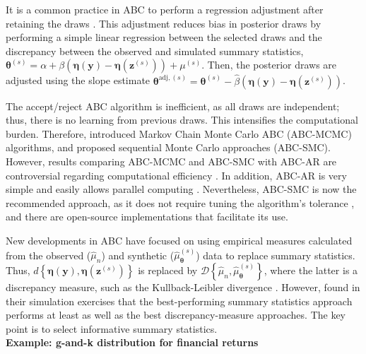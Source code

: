It is a common practice in ABC to perform a regression adjustment after retaining the draws \cite{beaumont2002approximate, leuenberger2010bayesian, sisson2018handbook}. This adjustment reduces bias in posterior draws by performing a simple linear regression between the selected draws and the discrepancy between the observed and simulated summary statistics, \( \boldsymbol{\theta}^{(s)} = \alpha + \beta \left(\boldsymbol{\eta}(\boldsymbol{y}) - \boldsymbol{\eta}(\boldsymbol{z}^{(s)})\right) + \mu^{(s)} \). Then, the posterior draws are adjusted using the slope estimate \( \boldsymbol{\theta}^{\text{adj},(s)} = \boldsymbol{\theta}^{(s)} - \hat{\beta} \left(\boldsymbol{\eta}(\boldsymbol{y}) - \boldsymbol{\eta}(\boldsymbol{z}^{(s)})\right) \).

The accept/reject ABC algorithm is inefficient, as all draws are independent; thus, there is no learning from previous draws. This intensifies the computational burden. Therefore, \cite{marjoram2003markov, wegmann2009efficient} introduced Markov Chain Monte Carlo ABC (ABC-MCMC) algorithms, and \cite{sisson2007sequential, drovandi2011estimation, del2012adaptive, lenormand2013adaptive} proposed sequential Monte Carlo approaches (ABC-SMC). However, results comparing ABC-MCMC and ABC-SMC with ABC-AR are controversial regarding computational efficiency \cite{bertorelle2010abc}. In addition, ABC-AR is very simple and easily allows parallel computing \cite{frazier2019approximate}. Nevertheless, ABC-SMC is now the recommended approach, as it does not require tuning the algorithm's tolerance \cite{martin2024approximating}, and there are open-source implementations that facilitate its use.

New developments in ABC have focused on using empirical measures calculated from the observed ($\hat{\mu}_n$) and synthetic ($\hat{\mu}_{\boldsymbol{\theta}}^{(s)}$) data to replace summary statistics. Thus, $d\left\{ \boldsymbol\eta ({\boldsymbol y}),{\boldsymbol \eta }({\boldsymbol z}^{(s)})\right\}$ is replaced by $\mathcal{D}\left\{ \hat{\mu}_n,\hat{\mu}_{\boldsymbol{\theta}}^{(s)}\right\}$, where the latter is a discrepancy measure, such as the Kullback-Leibler divergence \cite{jiang2018approximate}. However, \cite{drovandi2022comparison} found in their simulation exercises that the best-performing summary statistics approach performs at least as well as the best discrepancy-measure approaches. The key point is to select informative summary statistics.\\

\textbf{Example: g-and-k distribution for financial returns} 

